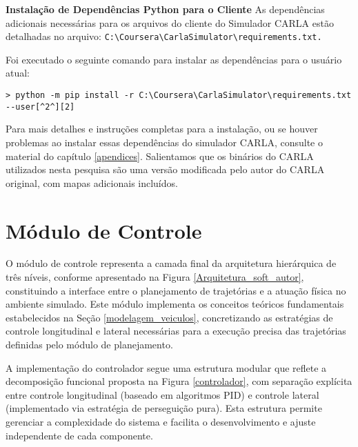 \textbf{Instalação de Dependências Python para o Cliente}
As dependências adicionais necessárias para os arquivos do cliente do Simulador CARLA estão detalhadas no arquivo: \texttt{C:\textbackslash Coursera\textbackslash CarlaSimulator\textbackslash requirements.txt.}

Foi executado o seguinte comando para instalar as dependências para o usuário atual: 
\begin{verbatim}> python -m pip install -r C:\Coursera\CarlaSimulator\requirements.txt 
--user[^2^][2]
\end{verbatim}
Para mais detalhes e instruções completas para a instalação, ou se houver problemas ao instalar essas dependências do simulador CARLA, consulte o material do capítulo \ref{apendices}. Salientamos que os binários do CARLA utilizados nesta pesquisa são uma versão modificada pelo autor \cite{University_of_Toronto2018-fe} do CARLA original, com mapas adicionais incluídos.

\section{Módulo de Controle} \label{controladores_imple}

O módulo de controle representa a camada final da arquitetura hierárquica de três níveis, conforme apresentado na Figura \ref{Arquitetura_soft_autor}, constituindo a interface entre o planejamento de trajetórias e a atuação física no ambiente simulado. Este módulo implementa os conceitos teóricos fundamentais estabelecidos na Seção \ref{modelagem_veiculos}, concretizando as estratégias de controle longitudinal e lateral necessárias para a execução precisa das trajetórias definidas pelo módulo de planejamento.

A implementação do controlador segue uma estrutura modular que reflete a decomposição funcional proposta na Figura \ref{controlador}, com separação explícita entre controle longitudinal (baseado em algoritmos PID) e controle lateral (implementado via estratégia de perseguição pura). Esta estrutura permite gerenciar a complexidade do sistema e facilita o desenvolvimento e ajuste independente de cada componente.

